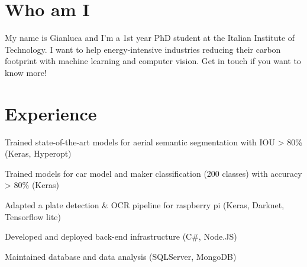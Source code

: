 \documentclass[]{resume}
\begin{document}
\hfill
\begin{minipage}[t]{0.66\textwidth} 



\section{Who am I}
My name is Gianluca and I'm a 1st year PhD student at the Italian Institute of Technology. I want to help energy-intensive industries reducing their carbon footprint with machine learning and computer vision. Get in touch if you want to know more!


\section{Experience}
\vspace{\topsep} %
\begin{tightemize}
 \item Trained state-of-the-art models for aerial
  semantic segmentation with IOU > 80\% (Keras, Hyperopt) \item Trained models
  for car model and maker classification (200 classes) with accuracy > 80\% (Keras)
  \item Adapted a plate detection \& OCR pipeline for raspberry pi (Keras, Darknet, Tensorflow lite)
\end{tightemize}
\sectionsep

\begin{tightemize}
\item Developed and deployed back-end infrastructure (C\#, Node.JS)
\item Maintained database and data analysis (SQLServer, MongoDB)
\end{tightemize}
\sectionsep
{}

\sectionsep



\end{minipage}
\end{document}
